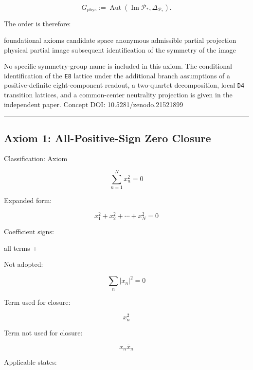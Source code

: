 \documentclass[
  a4paper,
]{article}
\newenvironment{Shaded}{}{}
\newcommand{\NormalTok}[1]{#1}
\begin{document}
\[
G_{\mathrm{phys}}
:=
\operatorname{Aut}
\left(
\operatorname{Im}\mathcal P_*,
\Delta_{\mathcal P_*}
\right).
\]

The order is therefore:

\begin{Shaded}
\begin{Highlighting}[]
\NormalTok{foundational axioms}
\NormalTok{candidate space}
\NormalTok{anonymous admissible partial projection}
\NormalTok{physical partial image}
\NormalTok{subsequent identification of the symmetry of the image}
\end{Highlighting}
\end{Shaded}

No specific symmetry-group name is included in this axiom. The
conditional identification of the \texttt{E8} lattice under the
additional branch assumptions of a positive-definite eight-component
readout, a two-quartet decomposition, local \texttt{D4} transition
lattices, and a common-center neutrality projection is given in the
independent paper. Concept DOI: 10.5281/zenodo.21521899

\begin{center}\rule{0.5\linewidth}{0.5pt}\end{center}

\subsection{Axiom 1: All-Positive-Sign Zero
Closure}\label{axiom-1-all-positive-sign-zero-closure}

Classification: Axiom

\[
\sum_{n=1}^{N}x_n^2=0
\]

Expanded form:

\[
x_1^2+x_2^2+\cdots+x_N^2=0
\]

Coefficient signs:

\begin{Shaded}
\begin{Highlighting}[]
\NormalTok{all terms +}
\end{Highlighting}
\end{Shaded}

Not adopted:

\[
\sum_n |x_n|^2=0
\]

Term used for closure:

\[
x_n^2
\]

Term not used for closure:

\[
x_n\bar{x}_n
\]

Applicable states:
\end{document}
